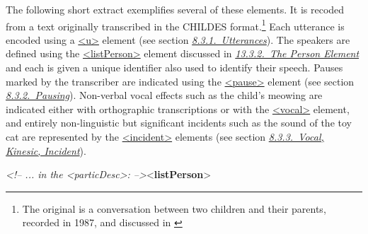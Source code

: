 The following short extract exemplifies several of these elements. It is recoded from a text originally transcribed in the CHILDES format.\footnote{The original is a conversation between two children and their parents, recorded in 1987, and discussed in \cite{TS-BIBL-4}} Each utterance is encoded using a \hyperref[TEI.u]{<u>} element (see section \textit{\hyperref[TSBAUT]{8.3.1.\ Utterances}}). The speakers are defined using the \hyperref[TEI.listPerson]{<listPerson>} element discussed in \textit{\hyperref[NDPERSE]{13.3.2.\ The Person Element}} and each is given a unique identifier also used to identify their speech. Pauses marked by the transcriber are indicated using the \hyperref[TEI.pause]{<pause>} element (see section \textit{\hyperref[TSBAPA]{8.3.2.\ Pausing}}). Non-verbal vocal effects such as the child's meowing are indicated either with orthographic transcriptions or with the \hyperref[TEI.vocal]{<vocal>} element, and entirely non-linguistic but significant incidents such as the sound of the toy cat are represented by the \hyperref[TEI.incident]{<incident>} elements (see section \textit{\hyperref[TSBAVO]{8.3.3.\ Vocal, Kinesic, Incident}}). \par\bgroup{}\exampleFont \begin{shaded}\noindent\mbox{}\mbox{}\newline 
\textit{<!-- ... in the <particDesc>: -->}{<\textbf{listPerson}>}\mbox{}\newline 

\end{shaded}
